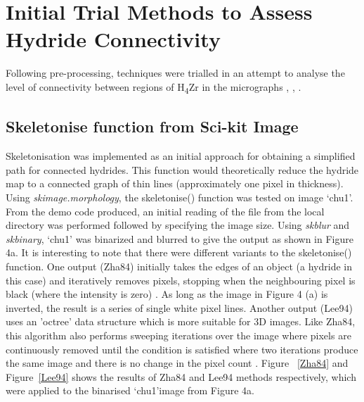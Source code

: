 \documentclass{article}
\begin{document}
	\section{Initial Trial Methods to Assess Hydride Connectivity}
	Following pre-processing, techniques were trialled in an attempt to analyse the level of connectivity between regions of H\textsubscript{4}Zr in the micrographs \cite{Sharma2018}, \cite{Simon2021}, \cite{Sunil2020}.

	\subsection{Skeletonise function from Sci-kit Image}
	Skeletonisation was implemented as an initial approach for obtaining a simplified path for connected hydrides. This function would theoretically reduce the hydride map to a connected graph of thin lines (approximately one pixel in thickness). Using \textit{skimage.morphology}, the skeletonise() function was tested on image ‘chu1’. From the demo code produced, an initial reading of the file from the local directory was performed followed by specifying the image size. Using \textit{skblur} and \textit {skbinary}, ‘chu1’ was binarized and blurred to give the output as shown in Figure 4a. It is interesting to note that there were different variants to the skeletonise() function. One output (Zha84) initially takes the edges of an object (a hydride in this case) and iteratively removes pixels, stopping when the neighbouring pixel is black (where the intensity is zero) \cite{ScikitimageA}. As long as the image in Figure 4 (a) is inverted, the result is a series of single white pixel lines. Another output (Lee94) uses an 'octree' data structure which is more suitable for 3D images. Like Zha84, this algorithm also performs sweeping iterations over the image where pixels are continuously removed until the condition is satisfied where two iterations produce the same image and there is no change in the pixel count \cite{ScikitimageA}. Figure ~\ref{Zha84}  and Figure~\ref{Lee94} shows the results of Zha84 and Lee94 methods respectively, which were applied to the binarised ‘chu1’image from Figure 4a.
\\
\end{document}

